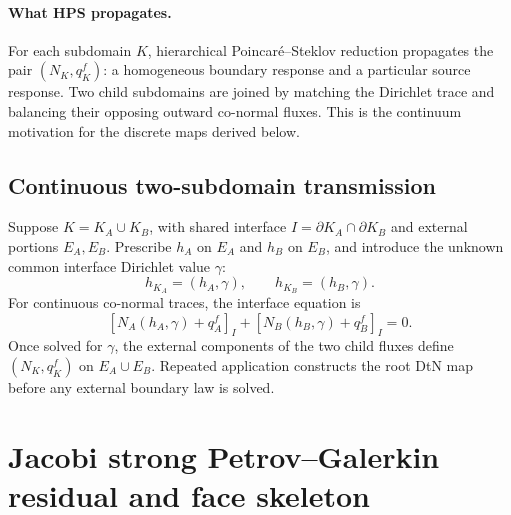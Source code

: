 \documentclass[11pt]{article}
\begin{document}
\paragraph{What HPS propagates.}
For each subdomain $K$, hierarchical Poincar\'e--Steklov reduction
propagates the pair $(N_K,q_K^f)$: a homogeneous boundary response and a
particular source response.  Two child subdomains are joined by matching
the Dirichlet trace and balancing their opposing outward co-normal fluxes.
This is the continuum motivation for the discrete maps derived below.

\subsection{Continuous two-subdomain transmission}
Suppose $K=K_A\cup K_B$, with shared interface
$I=\partial K_A\cap\partial K_B$ and external portions $E_A,E_B$.
Prescribe $h_A$ on $E_A$ and $h_B$ on $E_B$, and introduce the unknown
common interface Dirichlet value $\gamma$:
\begin{equation}\label{eq:full_cont_children_dirichlet}
 h_{K_A}=(h_A,\gamma),\qquad
 h_{K_B}=(h_B,\gamma).
\end{equation}
For continuous co-normal traces, the interface equation is
\begin{equation}\label{eq:full_cont_interface}
 \left[N_A(h_A,\gamma)+q_A^f\right]_{I}
 +\left[N_B(h_B,\gamma)+q_B^f\right]_{I}=0.
\end{equation}
Once solved for $\gamma$, the external components of the two child
fluxes define $(N_K,q_K^f)$ on $E_A\cup E_B$.  Repeated application
constructs the root DtN map before any external boundary law is solved.

\section{Jacobi strong Petrov--Galerkin residual and face skeleton}
\end{document}
